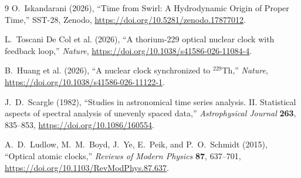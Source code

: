 \begin{thebibliography}{9}
O.~Iskandarani (2026),
``Time from Swirl: A Hydrodynamic Origin of Proper Time,''
SST-28, Zenodo, \url{https://doi.org/10.5281/zenodo.17877012}.

L.~Toscani De Col et al. (2026),
``A thorium-229 optical nuclear clock with feedback loop,''
\emph{Nature}, \url{https://doi.org/10.1038/s41586-026-11084-4}.

B.~Huang et al. (2026),
``A nuclear clock synchronized to $^{229}$Th,''
\emph{Nature}, \url{https://doi.org/10.1038/s41586-026-11122-1}.

J.~D.~Scargle (1982),
``Studies in astronomical time series analysis. II. Statistical aspects of spectral analysis of unevenly spaced data,''
\emph{Astrophysical Journal} \textbf{263}, 835--853,
\url{https://doi.org/10.1086/160554}.

A.~D.~Ludlow, M.~M.~Boyd, J.~Ye, E.~Peik, and P.~O.~Schmidt (2015),
``Optical atomic clocks,''
\emph{Reviews of Modern Physics} \textbf{87}, 637--701,
\url{https://doi.org/10.1103/RevModPhys.87.637}.
\end{thebibliography}
